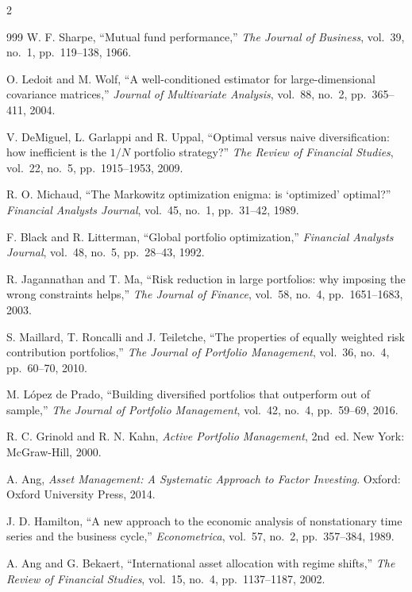 \begin{footnotesize}
\begin{multicols}{2}
\begin{thebibliography}{999}
 W. F. Sharpe, ``Mutual fund performance,'' \emph{The Journal of Business},
vol.~39, no.~1, pp.~119--138, 1966.

 O. Ledoit and M. Wolf, ``A well-conditioned estimator for large-dimensional
covariance matrices,'' \emph{Journal of Multivariate Analysis}, vol.~88, no.~2, pp.~365--411, 2004.

 V. DeMiguel, L. Garlappi and R. Uppal, ``Optimal versus naive
diversification: how inefficient is the $1/N$ portfolio strategy?'' \emph{The Review of Financial
Studies}, vol.~22, no.~5, pp.~1915--1953, 2009.

 R. O. Michaud, ``The Markowitz optimization enigma: is `optimized'
optimal?'' \emph{Financial Analysts Journal}, vol.~45, no.~1, pp.~31--42, 1989.

 F. Black and R. Litterman, ``Global portfolio optimization,''
\emph{Financial Analysts Journal}, vol.~48, no.~5, pp.~28--43, 1992.

 R. Jagannathan and T. Ma, ``Risk reduction in large portfolios: why
imposing the wrong constraints helps,'' \emph{The Journal of Finance}, vol.~58, no.~4,
pp.~1651--1683, 2003.

 S. Maillard, T. Roncalli and J. Teiletche, ``The properties of equally
weighted risk contribution portfolios,'' \emph{The Journal of Portfolio Management}, vol.~36,
no.~4, pp.~60--70, 2010.

 M. L\'opez de Prado, ``Building diversified portfolios that outperform
out of sample,'' \emph{The Journal of Portfolio Management}, vol.~42, no.~4, pp.~59--69, 2016.

 R. C. Grinold and R. N. Kahn, \emph{Active Portfolio Management}, 2nd~ed.
New York: McGraw-Hill, 2000.

 A. Ang, \emph{Asset Management: A Systematic Approach to Factor Investing}.
Oxford: Oxford University Press, 2014.

 J. D. Hamilton, ``A new approach to the economic analysis of nonstationary
time series and the business cycle,'' \emph{Econometrica}, vol.~57, no.~2, pp.~357--384, 1989.

 A. Ang and G. Bekaert, ``International asset allocation with regime shifts,''
\emph{The Review of Financial Studies}, vol.~15, no.~4, pp.~1137--1187, 2002.


\end{thebibliography}
\end{multicols}
\end{footnotesize}
